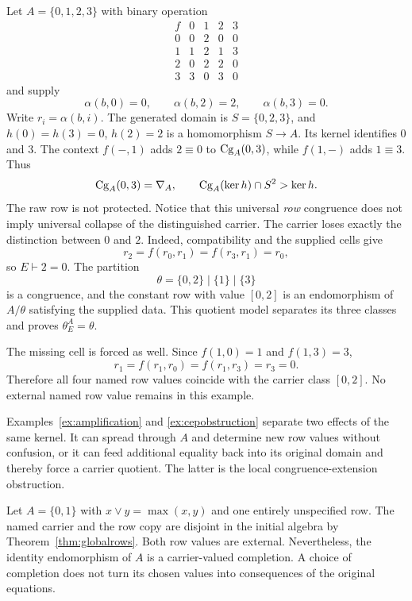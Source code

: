 \begin{example}\label{ex:cepobstruction}
Let $A=\{0,1,2,3\}$ with binary operation
\[
\begin{array}{c|cccc}
f&0&1&2&3\\\hline
0&0&2&0&0\\
1&1&2&1&3\\
2&0&2&2&0\\
3&3&0&3&0
\end{array}
\]
and supply
\[
\alpha(b,0)=0,
\qquad
\alpha(b,2)=2,
\qquad
\alpha(b,3)=0.
\]
Write $r_i=\alpha(b,i)$. The generated domain is $S=\{0,2,3\}$,
and $h(0)=h(3)=0$, $h(2)=2$ is a homomorphism $S\to A$.
Its kernel identifies $0$ and $3$. The context $f(-,1)$ adds $2\equiv0$
to $\operatorname{Cg}_A(0,3)$, while $f(1,-)$ adds $1\equiv3$. Thus
\[
\operatorname{Cg}_A(0,3)=\nabla_A,
\qquad
\operatorname{Cg}_A(\ker h)\cap S^2>\ker h.
\]
The raw row is not protected. Notice that this universal \emph{row}
congruence does not imply universal collapse of the distinguished carrier.
The carrier loses exactly the distinction between $0$ and $2$.
Indeed, compatibility and the supplied cells give
\[
r_2=f(r_0,r_1)=f(r_3,r_1)=r_0,
\]
so $E\vdash 2=0$. The partition
\[
\theta=\{0,2\}\mid\{1\}\mid\{3\}
\]
is a congruence, and the constant row with value $[0,2]$ is an endomorphism
of $A/\theta$ satisfying the supplied data. This quotient model separates
its three classes and proves $\theta_E^A=\theta$.

The missing cell is forced as well. Since $f(1,0)=1$ and $f(1,3)=3$,
\[
r_1=f(r_1,r_0)=f(r_1,r_3)=r_3=0.
\]
Therefore all four named row values coincide with the carrier class
$[0,2]$. No external named row value remains in this example.
\end{example}

Examples~\ref{ex:amplification} and \ref{ex:cepobstruction} separate two effects of the same kernel.  It can spread through $A$ and determine new row values without confusion, or it can feed additional equality back into its original domain and thereby force a carrier quotient.  The latter is the local congruence-extension obstruction.


\begin{example}\label{ex:externalcompletion}
Let $A=\{0,1\}$ with $x\vee y=\max(x,y)$ and one entirely unspecified row.
The named carrier and the row copy are disjoint in the initial algebra by
Theorem~\ref{thm:globalrows}. Both row values are external. Nevertheless,
the identity endomorphism of $A$ is a carrier-valued completion.
A choice of completion does not turn its chosen values into consequences
of the original equations.
\end{example}
